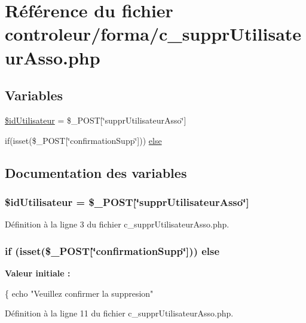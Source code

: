 \hypertarget{c__suppr_utilisateur_asso_8php}{}\section{Référence du fichier controleur/forma/c\+\_\+suppr\+Utilisateur\+Asso.php}
\label{c__suppr_utilisateur_asso_8php}
\subsection*{Variables}
\begin{DoxyCompactItemize}
\item 
\hyperlink{c__suppr_utilisateur_asso_8php_aef2ac477d895384d08de1ff55a1683db}{\$id\+Utilisateur} = \$\+\_\+\+P\+O\+ST\mbox{[}\char`\"{}suppr\+Utilisateur\+Asso\char`\"{}\mbox{]}
\item 
if(isset(\$\+\_\+\+P\+O\+ST\mbox{[}\char`\"{}confirmation\+Supp\char`\"{}\mbox{]})) \hyperlink{c__suppr_utilisateur_asso_8php_a2823a02e8879b35b90b193b3ea51862f}{else}
\end{DoxyCompactItemize}


\subsection{Documentation des variables}
\subsubsection[{\texorpdfstring{\$id\+Utilisateur}{$idUtilisateur}}]{\setlength{\rightskip}{0pt plus 5cm}\$id\+Utilisateur = \$\+\_\+\+P\+O\+ST\mbox{[}\char`\"{}suppr\+Utilisateur\+Asso\char`\"{}\mbox{]}}\hypertarget{c__suppr_utilisateur_asso_8php_aef2ac477d895384d08de1ff55a1683db}{}\label{c__suppr_utilisateur_asso_8php_aef2ac477d895384d08de1ff55a1683db}


Définition à la ligne 3 du fichier c\+\_\+suppr\+Utilisateur\+Asso.\+php.

\subsubsection[{\texorpdfstring{else}{else}}]{\setlength{\rightskip}{0pt plus 5cm}if (isset(\$\+\_\+\+P\+O\+ST\mbox{[}\char`\"{}confirmation\+Supp\char`\"{}\mbox{]})) else}\hypertarget{c__suppr_utilisateur_asso_8php_a2823a02e8879b35b90b193b3ea51862f}{}\label{c__suppr_utilisateur_asso_8php_a2823a02e8879b35b90b193b3ea51862f}
{\bfseries Valeur initiale \+:}
\begin{DoxyCode}
\{
  echo \textcolor{stringliteral}{"Veuillez confirmer la suppresion"}
\end{DoxyCode}


Définition à la ligne 11 du fichier c\+\_\+suppr\+Utilisateur\+Asso.\+php.


